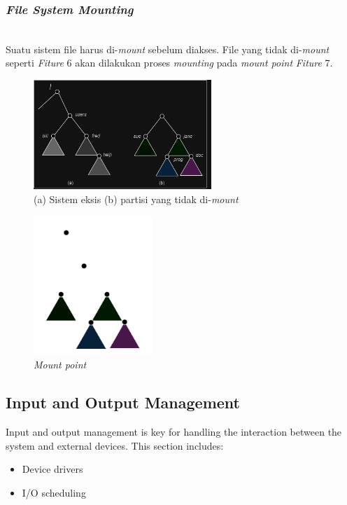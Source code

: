 \documentclass[12pt]{article}
\begin{document}
    \subsubsection{\textit{File System Mounting}}
    \\Suatu sistem file harus di-\textit{mount} sebelum diakses. File yang tidak di-\textit{mount} seperti \textit{Fiture} 6 akan dilakukan proses \textit{mounting} pada \textit{mount point} \textit{Fiture} 7.
        \begin{figure}[h!]
			\centering
			\includegraphics[width=0.6\textwidth]{asset/gambar6.png}
            \caption{(a) Sistem eksis (b) partisi yang tidak di-\textit{mount}}
        \end{figure}
        \begin{figure}[h!]
			\centering
			\includegraphics[width=0.4\textwidth]{asset/gambar7.png}
            \caption{\textit{Mount point}}
        \end{figure}

\subsection{Input and Output Management}
Input and output management is key for handling the interaction between the system and external devices. This section includes:
\begin{itemize}
    \item Device drivers
    \item I/O scheduling
\end{itemize}
\end{document}
